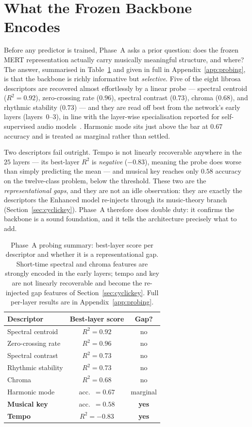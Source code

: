 \documentclass[12pt]{report}
\begin{document}
\section{What the Frozen Backbone Encodes}
\label{sec:results-phaseA}

Before any predictor is trained, Phase~A asks a prior question: does the frozen MERT representation actually carry musically meaningful structure, and where? The answer, summarised in Table~\ref{tab:probing-summary} and given in full in Appendix~\ref{app:probing}, is that the backbone is richly informative but \emph{selective}. Five of the eight librosa descriptors are recovered almost effortlessly by a linear probe --- spectral centroid ($R^{2}=0.92$), zero-crossing rate ($0.96$), spectral contrast ($0.73$), chroma ($0.68$), and rhythmic stability ($0.73$) --- and they are read off best from the network's early layers (layers~$0$--$3$), in line with the layer-wise specialisation reported for self-supervised audio models~\cite{ma_effectiveness_2023}. Harmonic mode sits just above the bar at $0.67$ accuracy and is treated as marginal rather than settled.

Two descriptors fail outright. Tempo is not linearly recoverable anywhere in the $25$ layers --- its best-layer $R^{2}$ is \emph{negative} ($-0.83$), meaning the probe does worse than simply predicting the mean --- and musical key reaches only $0.58$ accuracy on the twelve-class problem, below the threshold. These two are the \emph{representational gaps}, and they are not an idle observation: they are exactly the descriptors the Enhanced model re-injects through its music-theory branch (Section~\ref{sec:cyclickey}). Phase~A therefore does double duty: it confirms the backbone is a sound foundation, and it tells the architecture precisely what to add.

\begin{table}[t]
\centering
\small
\begin{tabular}{l c c}
\toprule
\textbf{Descriptor} & \textbf{Best-layer score} & \textbf{Gap?} \\
\midrule
Spectral centroid    & $R^{2}=0.92$  & no \\
Zero-crossing rate   & $R^{2}=0.96$  & no \\
Spectral contrast    & $R^{2}=0.73$  & no \\
Rhythmic stability   & $R^{2}=0.73$  & no \\
Chroma               & $R^{2}=0.68$  & no \\
Harmonic mode        & acc.\ $=0.67$ & marginal \\
\textbf{Musical key} & acc.\ $=0.58$ & \textbf{yes} \\
\textbf{Tempo}       & $R^{2}=-0.83$ & \textbf{yes} \\
\bottomrule
\end{tabular}
\caption{Phase~A probing summary: best-layer score per descriptor and whether it is a representational gap. Short-time spectral and chroma features are strongly encoded in the early layers; tempo and key are not linearly recoverable and become the re-injected gap features of Section~\ref{sec:cyclickey}. Full per-layer results are in Appendix~\ref{app:probing}.}
\label{tab:probing-summary}
\end{table}
\end{document}
